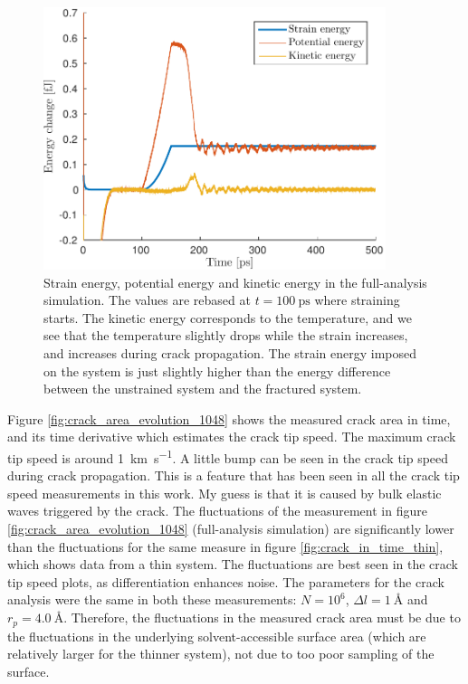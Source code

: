 \begin{figure}
\centering
\includegraphics[width=10cm]{../figures/thesis/strain_pot_kin_eng_1048_24_24_12.pdf}
\caption{Strain energy, potential energy and kinetic energy in the full-analysis simulation. The values are rebased at $t=\SI{100}{\pico\second}$ where straining starts. The kinetic energy corresponds to the temperature, and we see that the temperature slightly drops while the strain increases, and increases during crack propagation. The strain energy imposed on the system is just slightly higher than the energy difference between the unstrained system and the fractured system.}
\label{fig:energy_1048}
\end{figure}

Figure \ref{fig:crack_area_evolution_1048} shows the measured crack area in time, and its time derivative which estimates the crack tip speed. The maximum crack tip speed is around \SI{1}{\kilo\meter\per\second}. A little bump can be seen in the crack tip speed during crack propagation. This is a feature that has been seen in all the crack tip speed measurements in this work. My guess is that it is caused by bulk elastic waves triggered by the crack. The fluctuations of the measurement in figure \ref{fig:crack_area_evolution_1048} (full-analysis simulation) are significantly lower than the fluctuations for the same measure in figure \ref{fig:crack_in_time_thin}, which shows data from a thin system. The fluctuations are best seen in the crack tip speed plots, as differentiation enhances noise. The parameters for the crack analysis were the same in both these measurements: $N = 10^6$, $\Delta l = \SI{1}{\angstrom}$ and $r_p = \SI{4.0}{\angstrom}$. Therefore, the fluctuations in the measured crack area must be due to the fluctuations in the underlying solvent-accessible surface area (which are relatively larger for the thinner system), not due to too poor sampling of the surface. 


